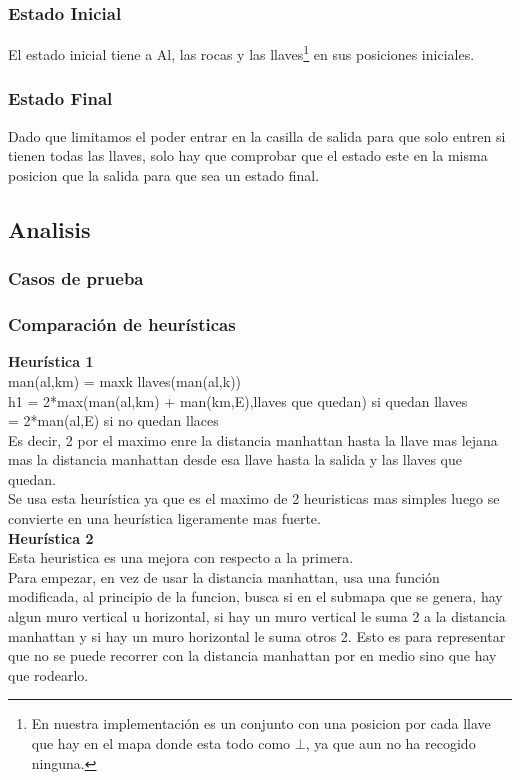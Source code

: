 \documentclass[11pt,spanish]{article}
\begin{document}
		\subsubsection{Estado Inicial}
			El estado inicial tiene a Al, las rocas y las llaves\footnote{En nuestra implementación es un conjunto con una posicion por cada llave que hay en el mapa donde esta todo como $\bot$, ya que aun no ha recogido ninguna.} en sus posiciones iniciales.
		\subsubsection{Estado Final}
			Dado que limitamos el poder entrar en la casilla de salida para que solo entren si tienen todas las llaves, solo hay que comprobar que el estado este en la misma posicion que la salida para que sea un estado final.
	\subsection{Analisis}
		\subsubsection{Casos de prueba}
		\subsubsection{Comparación de heurísticas}
			\textbf{Heurística 1}\\
			man(al,km) = maxk llaves(man(al,k))\\
			h1 = 2*max(man(al,km) + man(km,E),llaves que quedan) si quedan llaves\\
				 = 2*man(al,E) si no quedan llaces\\
			Es decir, 2 por el maximo enre la distancia manhattan hasta la llave mas lejana mas la distancia manhattan desde esa llave hasta la salida y las llaves que quedan.\\
			Se usa esta heurística ya que es el maximo de 2 heuristicas mas simples luego se convierte en una heurística ligeramente mas fuerte.\\
			\textbf{Heurística 2}\\
			Esta heuristica es una mejora con respecto a la primera.\\
			Para empezar, en vez de usar la distancia manhattan, usa una función modificada, al principio de la funcion, busca si en el submapa que se genera, hay algun muro vertical u horizontal, si hay un muro vertical le suma 2 a la distancia manhattan y si hay un muro horizontal le suma otros 2. Esto es para representar que no se puede recorrer con la distancia manhattan por en medio sino que hay que rodearlo.
\end{document}
